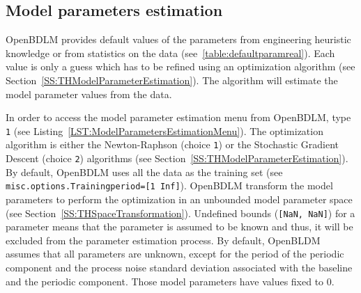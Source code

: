 \subsection{Model parameters estimation}
\label{S:PARAMESTIMATION}

OpenBDLM provides default values of the parameters from engineering heuristic knowledge or from statistics on the data (see~\ref{table:defaultparamreal}).
Each value is only a guess which has to be refined using an optimization algorithm (see Section~\ref{SS:THModelParameterEstimation}). 
The algorithm will estimate the model parameter values from the data.

In order to access the model parameter estimation menu from OpenBDLM, type  \colorbox{light-gray}{\lstinline[basicstyle = \mlttfamily \small, backgroundcolor = \color{light-gray}]!1!} (see Listing~\ref{LST:ModelParametersEstimationMenu}).
The optimization algorithm is either the Newton-Raphson (choice \colorbox{light-gray}{\lstinline[basicstyle = \mlttfamily \small, backgroundcolor = \color{light-gray}]!1!}) or the Stochastic Gradient Descent  (choice \colorbox{light-gray}{\lstinline[basicstyle = \mlttfamily \small, backgroundcolor = \color{light-gray}]!2!}) algorithms (see Section~\ref{SS:THModelParameterEstimation}).
By default, OpenBDLM uses all the data as the training set (see \lstinline[basicstyle = \mlttfamily \small ]!misc.options.Trainingperiod=[1 Inf]!).
OpenBDLM transform the model parameters to perform the optimization in an unbounded model parameter space (see Section~\ref{SS:THSpaceTransformation}).
Undefined bounds (\lstinline[basicstyle = \mlttfamily \small ]![NaN, NaN]!)  for a parameter means that the parameter is assumed to be known and thus, it will be excluded from the parameter estimation process.
By default, OpenBLDM assumes that all parameters are unknown, except for the period of the periodic component and the process noise standard deviation associated with the baseline and the periodic component.
Those model parameters have values fixed to 0.\\

